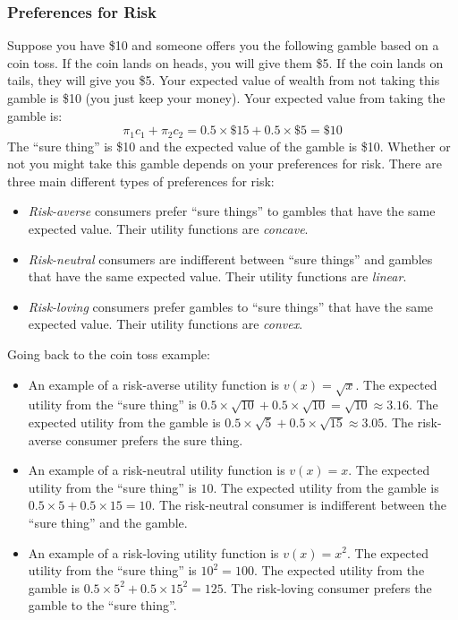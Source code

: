 \documentclass{article}
\begin{document}
\subsubsection*{Preferences for Risk}
Suppose you have \$10 and someone offers you the following gamble based on a coin toss. If the coin lands on heads, you will give them \$5. If the coin lands on tails, they will give you \$5. Your expected value of wealth from not taking this gamble is \$10 (you just keep your money). Your expected value from taking the gamble is:
\begin{equation*}
  \pi_1 c_1 + \pi_2 c_2 = 0.5 \times \$15 + 0.5 \times \$5 = \$10
\end{equation*}
The ``sure thing'' is \$10 and the expected value of the gamble is \$10. Whether or not you might take this gamble depends on your preferences for risk. There are three main different types of preferences for risk:
\begin{itemize}
  \item \emph{Risk-averse} consumers prefer ``sure things'' to gambles that have the same expected value. Their utility functions are \emph{concave}.
  \item \emph{Risk-neutral} consumers are indifferent between ``sure things'' and gambles that have the same expected value. Their utility functions are \emph{linear}.
  \item \emph{Risk-loving} consumers prefer gambles to ``sure things'' that have the same expected value. Their utility functions are \emph{convex}.
\end{itemize}
Going back to the coin toss example:
\begin{itemize}
  \item An example of a risk-averse utility function is $v\left( x \right)=\sqrt{x}$. The expected utility from the ``sure thing'' is $0.5\times\sqrt{10} + 0.5\times\sqrt{10}=\sqrt{10}\approx 3.16$. The expected utility from the gamble is $0.5\times \sqrt{5} + 0.5\times \sqrt{15}\approx 3.05$. The risk-averse consumer prefers the sure thing.
  \item An example of a risk-neutral utility function is $v\left( x \right)=x$. The expected utility from the ``sure thing'' is $10$. The expected utility from the gamble is $0.5\times 5 + 0.5 \times 15 = 10$. The risk-neutral consumer is indifferent between the ``sure thing'' and the gamble.
  \item An example of a risk-loving utility function is $v\left( x \right)=x^2$. The expected utility from the ``sure thing'' is $10^2=100$. The expected utility from the gamble is $0.5\times 5^2 + 0.5 \times 15^2 = 125$. The risk-loving consumer prefers the gamble to the ``sure thing''.
\end{itemize}
\end{document}
